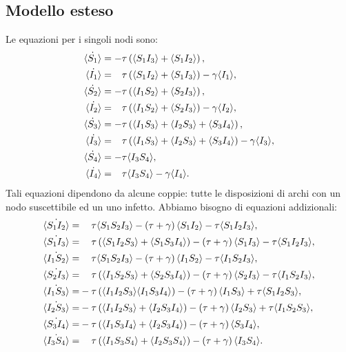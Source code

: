 \subsection{Modello esteso}\label{lollipop_completo}
Le equazioni per i singoli nodi sono:
 \begin{equation*}
 \begin{aligned}
 	\dot{\angol{S_1}}&= -\tau \tonde{ \angol{ S_1 I_3} + \angol{S_1 I_2}}, 
 \\ 
 	\dot{\angol{I_1}}&= \spa \tau \tonde{ \angol{ S_1 I_2} + \angol{S_1 I_3}} - \gamma\angol{I_1},
 \\
  	\dot{\angol{S_2}}&= -\tau \tonde{ \angol{ I_1 S_2} + \angol{S_2 I_3}}, 
 \\
 \dot{\angol{I_2}}&= \spa \tau \tonde{ \angol{ I_1 S_2} + \angol{S_2 I_3}} - \gamma\angol{I_2},
 \\
  \dot{\angol{S_3}}&= -\tau \tonde{ \angol{I_1 S_3} + \angol{I_2 S_3}+ \angol{S_3 I_4}},  \\
 \dot{\angol{I_3}}&= \spa \tau \tonde{ \angol{I_1 S_3} + \angol{I_2 S_3}+ \angol{S_3 I_4}}-\gamma\angol{I_3},\\
\dot{\angol{S_4}} &= -\tau \angol{I_3S_4},\\
  \dot{\angol{I_4}}&=\spa \tau\angol{I_3S_4}-\gamma\angol{I_4}.
 \end{aligned}	
 \end{equation*}
 Tali equazioni dipendono da alcune coppie: tutte le disposizioni di archi con un nodo suscettibile ed un uno infetto. Abbiamo bisogno di equazioni addizionali:
 \begin{equation*}
 \begin{aligned}
 \dot{\angol{S_1I_2}} =&\spa \tau\angol{S_1S_2I_3} - \tonde{ \tau + \gamma} \angol{S_1 I_2} -\tau\angol{S_1I_2I_3},\\
 \dot{\angol{S_1I_3}}=&\spa \tau\tonde{ \angol{S_1I_2S_3} + \angol{S_1S_3I_4}} - \tonde{ \tau +\gamma}\angol{S_1 I_3} -\tau \angol{ S_1 I_2 I_3},\\
 \dot{\angol{I_1S_2}} =&\spa\tau\angol{S_1S_2I_3} - \tonde{ \tau + \gamma} \angol{I_1 S_2} -\tau\angol{I_1S_2I_3},\\
\dot{\angol{S_2I_3}} =&\spa \tau\tonde{\angol{I_1S_2S_3} +{\angol{S_2S_3I_4}}} - \tonde{ \tau + \gamma} \angol{S_2 I_3} -\tau\angol{I_1S_2I_3},\\
 \dot{\angol{I_1S_3}} =&- \tau\tonde{\angol{I_1I_2S_3} \angol{I_1S_3I_4}} - \tonde{ \tau + \gamma} \angol{I_1 S_3} +\tau\angol{S_1I_2S_3},\\ 
\dot{\angol{I_2S_3}} =&- \tau\tonde{\angol{I_1I_2S_3} +\angol{I_2S_3I_4}} - \tonde{ \tau + \gamma} \angol{I_2 S_3} +\tau\angol{I_1S_2S_3},\\ 
 \dot{\angol{S_3I_4}} =&- \tau\tonde{\angol{I_1S_3I_4}+\angol{I_2S_3I_4}} - \tonde{ \tau + \gamma} \angol{S_3 I_4}, \\ 
    \dot{\angol{I_3S_4}} =& \spa \tau\tonde{\angol{I_1S_3S_4}+\angol{I_2S_3S_4}} - \tonde{ \tau + \gamma} \angol{I_3 S_4}.\\ 
\end{aligned}
 \end{equation*}
